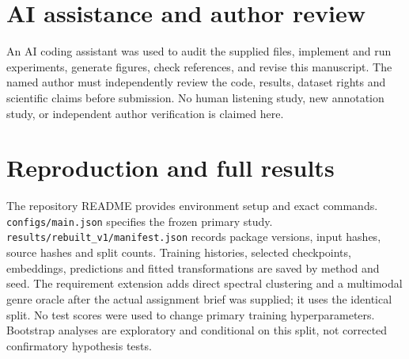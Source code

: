 \documentclass{article}
\begin{document}
\section*{AI assistance and author review}
An AI coding assistant was used to audit the supplied files, implement and run
experiments, generate figures, check references, and revise this manuscript.
The named author must independently review the code, results, dataset rights
and scientific claims before submission. No human listening study, new
annotation study, or independent author verification is claimed here.

\clearpage
\appendix
\section{Reproduction and full results}
\label{app:repro}
The repository README provides environment setup and exact commands.
\texttt{configs/main.json} specifies the frozen primary study.
\texttt{results/rebuilt\_v1/manifest.json} records package versions, input hashes,
source hashes and split counts. Training histories, selected checkpoints,
embeddings, predictions and fitted transformations are saved by method and
seed. The requirement extension adds direct spectral clustering and a
multimodal genre oracle after the actual assignment brief was supplied; it
uses the identical split. No test scores were used to change primary training
hyperparameters. Bootstrap analyses are exploratory and conditional on this
split, not corrected confirmatory hypothesis tests.







\clearpage
\end{document}
